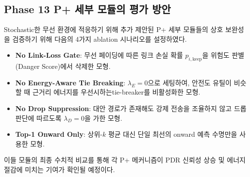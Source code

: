 \subsection{Phase 13 P+ 세부 모듈의 평가 방안}
Stochastic한 무선 환경에 적응하기 위해 추가 제안된 P+ 세부 모듈들의 상호 보완성을 검증하기 위해 다음의 4가지 ablation 시나리오를 설정하였다.
\begin{itemize}
    \item \textbf{No Link-Loss Gate}: 무선 페이딩에 따른 링크 손실 확률 $p_{i,\mathrm{keep}}$을 위험도 판별(Danger Score)에서 삭제한 모형.
    \item \textbf{No Energy-Aware Tie Breaking}: $\lambda_E = 0$으로 세팅하여, 안전도 유틸이 비슷할 때 근거리 에너지를 우선시하는tie-breaker를 비활성화한 모형.
    \item \textbf{No Drop Suppression}: 대안 경로가 존재해도 강제 전송을 조율하지 않고 드롭 판단에 따르도록 $\lambda_D = 0$을 가한 모형.
    \item \textbf{Top-1 Onward Only}: 상위-$k$ 평균 대신 단일 최선의 onward 예측 수명만을 사용한 모형.
\end{itemize}
이들 모듈의 최종 수치적 비교를 통해 각 P+ 메커니즘이 PDR 신뢰성 상승 및 에너지 절감에 미치는 기여가 확인될 예정이다.
